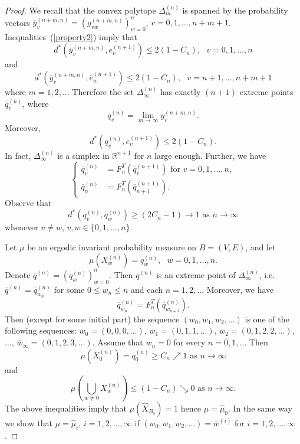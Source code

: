 \documentclass[11pt, english, reqno]{amsart}
\theoremstyle{definition}
\theoremstyle{remark}
\theoremstyle{plain}
\def\ov{\overline}
\def\wh{\widehat}
\numberwithin{equation}{section}
\begin{document}
{\begin{proof}
We recall that the convex polytope $\Delta_m^{(n)}$ is spanned by the
probability vectors $\ov y_v^{(n+m,n)} =
(g_{vw}^{(n+m,n)})_{w = 0}^{n}$, $v = 0,1,\ldots, n+m+1$.
Inequalities~(\ref{property2}) imply that
$$
d^{*}(\ov y_v^{(n+m,n)}, \ov e_v^{(n+1)}) \leq 2 (1 - C_n), \ \ \
v = 0,1,\ldots, n
$$
and
$$
d^{*}(\ov y_v^{(n+m,n)}, \ov e_n^{(n+1)}) \leq 2 (1 - C_n), \ \ \
 v = n + 1,\ldots, n + m + 1
$$
where $m = 1,2,\ldots$
Therefore the set $\Delta_{\infty}^{(n)}$ has exactly $(n + 1)$ extreme points
$\ov q_v^{(n)}$, where
$$
\ov  q_v^{(n)} = \lim_{m \rightarrow \infty} \ov y_v^{(n+m,n)}.
$$
Moreover,
$$
d^{*}(\ov q_v^{(n)}, \ov e_v^{(n+1)}) \leq 2 (1 - C_n).
$$
In fact, $\Delta_{\infty}^{(n)}$ is a simplex in $\mathbb{R}^{n + 1}$ for
$n$ large enough.
Further, we have
$$
\left\{
\begin{aligned}\label{property3}
\ov  q_v^{(n)} &= F_n^T(\ov  q_v^{(n+1)}) \mbox{ for } v = 0,1,\ldots, n,
\\
\ov  q_n^{(n)} &= F_n^T(\ov  q_{n+1}^{(n+1)}).
\end{aligned}
\right.
$$
Observe that
\begin{equation}\label{property4}
d^*(\ov  q_v^{(n)},\ov  q_w^{(n)}) \geq (2C_n - 1) \to 1
\mbox{ as } n \rightarrow \infty
\end{equation}
whenever $v \neq w$, $v, w \in \{0,1,\ldots, n\}$.

Let $\mu$ be an ergodic invariant probability measure on $B = (V,E)$,
 and let
$$
\mu(X_w^{(n)}) = q_w^{(n)}, \ \ \ w = 0,1,\ldots, n.
$$
Denote $\ov q^{(n)} = (q_w^{(n)})_{w = 0}^{n}$.
Then $\ov q^{(n)}$ is an extreme point of $\Delta_{\infty}^{(n)}$, i.e. $\ov q^{(n)}
= \ov q^{(n)}_{w_n}$ for some $0 \leq w_n \leq n$ and each $n = 1,2,
\ldots$ Moreover, we have
$$
\ov q^{(n)}_{w_n} = F_n^T(\ov q^{(n)}_{w_{n+1}}).
$$
Then (except for some  initial part) the
 sequence $(w_0, w_1, w_2, \ldots)$ is one of the following sequences:
$\ov w_0 = (0,0,0,\ldots)$, $\ov w_1 = (0,1,1,\ldots)$, $\ov w_2 =
(0,1,2,2,\ldots)$, $\ldots$, $\ov w_{\infty} = (0,1,2,3, \ldots)$. Assume
that $w_n = 0$ for every $n = 0,1,\ldots$ Then
$$
\mu\left(X_0^{(n)}\right) = q_0^{(n)} \geq C_n \nearrow 1 \mbox{ as } n
\rightarrow \infty
$$ and
$$
\mu\left(\bigcup_{w \neq 0} X_w^{(n)}\right) \leq (1 - C_n) \searrow 0
\mbox{ as } n \rightarrow \infty.
$$
The above inequalities imply that $\mu(\wh X_{B_0}) = 1$ hence $\mu =
\wh \mu_0$. In the same way we show that $\mu = \wh \mu_i$, $i = 1,2,
\ldots, \infty$ if $(w_0, w_1, w_2, \ldots) = \ov w^{(i)}$ for $i = 1,2,
\ldots, \infty$.
\end{proof}


}
\end{document}
